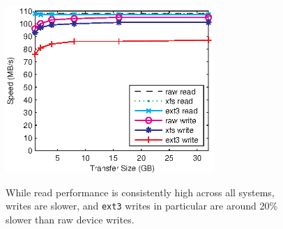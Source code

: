 {
\renewcommand{\baselinestretch}{1.0}
\begin{figure}[t]
\begin{center}

   \includegraphics[height=2.5in]{fig_disk_measurements.eps}

\end{center}
{While read performance is consistently high across all systems,
  writes are slower, and \texttt{ext3} writes in particular are around
  20\% slower than raw device writes.}  

\label{fig:disk_measurements}
\end{figure}
}

